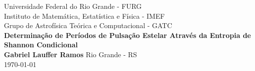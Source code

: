 \documentclass[
12pt, %
oneside, %
english, brazil, %
doublespacing,
nolistspacing, %
liststotoc, %
]{MastersDoctoralThesis} %
\begin{document}
\begin{titlepage}
	\begin{center}
\large
Universidade Federal do Rio Grande - FURG \\
Instituto de Matemática, Estatística e Física - IMEF \\
Grupo de Astrofísica Teórica e Computacional - GATC\\
\vspace{5cm}
\Huge
\textbf{Determinação de Períodos de Pulsação Estelar Através da Entropia de Shannon Condicional} \\
\vspace{3cm}
\Large
\textbf{Gabriel Lauffer Ramos}
\vfill
\large
Rio Grande - RS \\
\today
\end{center}
\end{titlepage}
\end{document}
